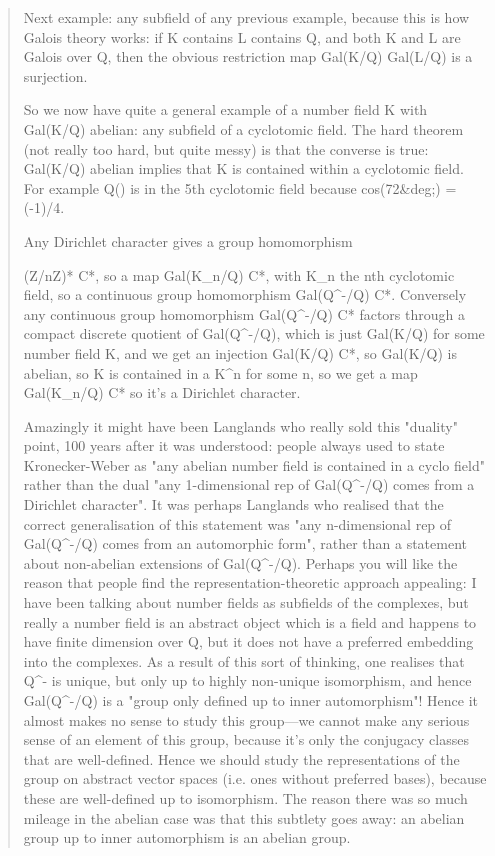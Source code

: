 \begin{quote}
 Next example: any subfield of any previous example, because this
 is how Galois theory works: if K contains L contains Q, and
 both K and L are Galois over Q, then the obvious restriction
 map Gal(K/Q) \to  Gal(L/Q) is a surjection.

 So we now have quite a general example of a number field K with
 Gal(K/Q) abelian: any subfield of a cyclotomic field. The hard
 theorem (not really too hard, but quite messy) is that the
 converse is true: Gal(K/Q) abelian implies that K is contained
 within a cyclotomic field. For example Q() is in the 5th 
 cyclotomic field because cos(72&deg;) = (-1)/4.
 
 Any Dirichlet character gives a group homomorphism

 (Z/nZ)* \to  C*, 
 so a map 
Gal(K_{n}/Q) \to  C*,
 with K_{n} the nth cyclotomic field,
 so a continuous group homomorphism 
Gal(Q^{-}/Q) \to  C*.
 Conversely any
 continuous group homomorphism
 Gal(Q^{-}/Q) \to  C*
 factors through a compact
 discrete quotient of Gal(Q^{-}/Q), 
 which is just Gal(K/Q) for some number
 field K, and we get an injection 
Gal(K/Q) \to  C*, 
so Gal(K/Q) is abelian,
 so K is contained in a K^{n} 
for some n, so we get a map 
Gal(K_{n}/Q) \to  C*
 so it's a Dirichlet character.
 
 Amazingly it might have been Langlands who really sold this "duality"
 point, 100 years after it was understood: people always used to
 state Kronecker-Weber as "any abelian number field is contained
 in a cyclo field" rather than the dual "any 1-dimensional rep
 of Gal(Q^{-}/Q) comes from a Dirichlet character".  It was perhaps
 Langlands who realised that the correct generalisation of this
 statement was "any n-dimensional rep of Gal(Q^{-}/Q) comes from
 an automorphic form", rather than a statement about non-abelian
 extensions of Gal(Q^{-}/Q).  Perhaps you will like the reason that
 people find the representation-theoretic approach appealing: I have
 been talking about number fields as subfields of the complexes,
 but really a number field is an abstract object which is a field
 and happens to have finite dimension over Q, but it does not have
 a preferred embedding into the complexes.  As a result of this
 sort of thinking, one realises that Q^{-} is unique, but only up
 to highly non-unique isomorphism, and hence Gal(Q^{-}/Q) is
 a "group only defined up to inner automorphism"!  Hence it almost
 makes no sense to study this group---we cannot make any serious
 sense of an element of this group, because it's only the
 conjugacy classes that are well-defined.  Hence we should study
 the representations of the group on abstract vector spaces (i.e.
 ones without preferred bases), because these are well-defined up
 to isomorphism.  The reason there was so much mileage in the abelian
 case was that this subtlety goes away: an abelian group up to inner
 automorphism is an abelian group.


\end{quote}
